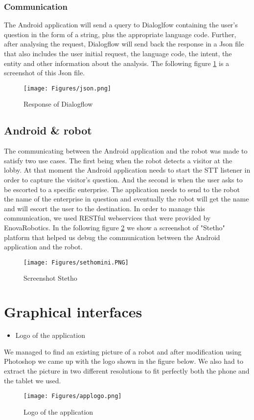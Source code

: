 \subsubsection{Communication}
The Android application will send a query to Dialoglfow containing the user's question in the form of a string, plus the appropriate language code. Further, after analysing the request, Dialogflow will send back the response in a Json file that also includes the user initial request, the language code, the intent, the entity and other information about the analysis. The following figure \ref{fig:rsponse dialog} is a screenshot of this Json file.
\begin{figure}[H]
\centering
\texttt{[image: Figures/json.png]}
\caption{Response of Dialogflow}
\label{fig:rsponse dialog}
\end{figure}
\subsection{Android \& robot}
The communicating between the Android application and the robot was made to satisfy two use cases. The first being when the robot detects a visitor at the lobby. At that moment the Android application needs to start the STT listener in order to capture the visitor's question. And the second is when the user asks to be escorted to a specific enterprise. The application needs to send to the robot the name of the enterprise in question and eventually the robot will get the name and will escort the user to the destination.\newline
\newline
In order to manage this communication, we used RESTful webservices that were provided by EnovaRobotics. In the following figure \ref{fig:stetho inspect} we show a screenshot of "Stetho" platform that helped us debug the communication between the Android application and the robot.
\begin{figure}[H]
\centering
\texttt{[image: Figures/sethomini.PNG]}
\caption{Screenshot Stetho}
\label{fig:stetho inspect}
\end{figure}
\section{Graphical interfaces}
\begin{itemize}
    \item Logo of the application
\end{itemize}
We managed to find an existing picture of a robot and after modification using Photoshop we came up with the logo shown in the figure below. We also had to extract the picture in two different resolutions to fit perfectly both the phone and the tablet we used.   
\begin{figure}[H]
\centering
\texttt{[image: Figures/applogo.png]}
\caption{Logo of the application}
\end{figure}

